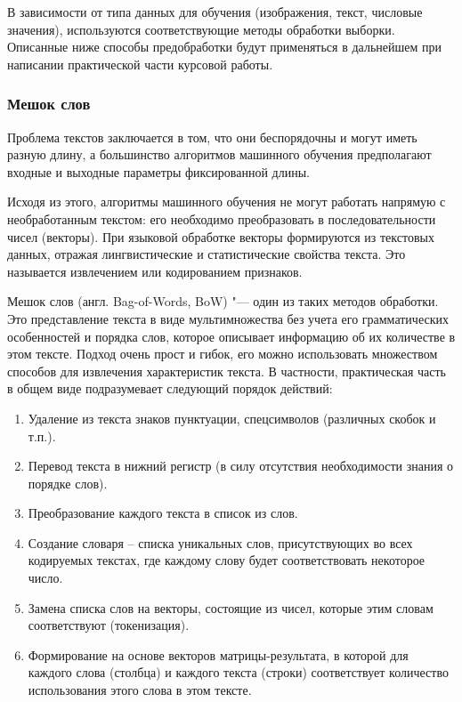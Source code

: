 \documentclass[bachelor, och, coursework]{SCWorks}
\begin{document}
        В зависимости от типа данных для обучения (изображения, текст, числовые
        значения), используются соответствующие методы обработки выборки.
        Описанные ниже способы предобработки будут применяться в дальнейшем при
        написании практической части курсовой работы.

        \subsubsection{Мешок слов}

            Проблема текстов заключается в том, что они беспорядочны и могут
            иметь разную длину, а большинство алгоритмов машинного обучения
            предполагают входные и выходные параметры фиксированной длины.

            Исходя из этого, алгоритмы машинного обучения не могут работать
            напрямую с необработанным текстом: его необходимо преобразовать в
            последовательности чисел (векторы). При языковой обработке векторы
            формируются из текстовых данных, отражая лингвистические и
            статистические свойства текста. Это называется извлечением или
            кодированием признаков.
            
            Мешок слов (англ. Bag-of-Words, BoW) "--- один из таких методов
            обработки. Это представление текста в виде мультимножества без учета
            его грамматических особенностей и порядка слов, которое описывает
            информацию об их количестве в этом тексте. Подход очень прост и
            гибок, его можно использовать множеством способов для извлечения
            характеристик текста. В частности, практическая часть в общем виде
            подразумевает следующий порядок действий:

            \begin{enumerate}
                \item Удаление из текста знаков пунктуации, спецсимволов
                (различных скобок и т.п.).
                \item Перевод текста в нижний регистр (в силу отсутствия
                необходимости знания о порядке слов).
                \item Преобразование каждого текста в список из слов.
                \item Создание словаря – списка уникальных слов, присутствующих
                во всех кодируемых текстах, где каждому слову будет
                соответствовать некоторое число.
                \item Замена списка слов на векторы, состоящие из чисел, которые
                этим словам соответствуют (токенизация).
                \item Формирование на основе векторов матрицы-результата, в
                которой для каждого слова (столбца) и каждого текста (строки)
                соответствует количество использования этого слова в этом
                тексте.

            \end{enumerate}
\end{document}
